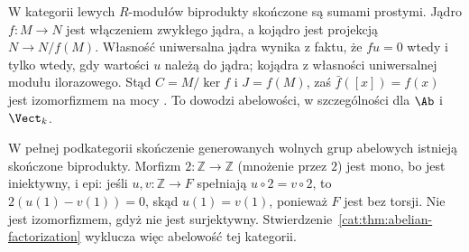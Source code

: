 \begin{przyklad}[Moduły]\label{cat:ex:abelian-modules}
W kategorii lewych $R$-modułów biprodukty skończone są sumami prostymi. Jądro $f:M\to N$ jest włączeniem zwykłego jądra, a kojądro jest projekcją $N\to N/f(M)$. Własność uniwersalna jądra wynika z faktu, że $fu=0$ wtedy i tylko wtedy, gdy wartości $u$ należą do jądra; kojądra z własności uniwersalnej modułu ilorazowego. Stąd $C=M/\ker f$ i $J=f(M)$, zaś $\bar f([x])=f(x)$ jest izomorfizmem na mocy . To dowodzi abelowości, w szczególności dla $\Ab$ i $\Vect_k$.
\end{przyklad}
\begin{przyklad}\label{cat:ex:additive-not-abelian}
W pełnej podkategorii skończenie generowanych wolnych grup abelowych istnieją skończone biprodukty. Morfizm $2:\mathbb Z\to\mathbb Z$ (mnożenie przez $2$) jest mono, bo jest iniektywny, i epi: jeśli $u,v:\mathbb Z\to F$ spełniają $u\circ2=v\circ2$, to $2(u(1)-v(1))=0$, skąd $u(1)=v(1)$, ponieważ $F$ jest bez torsji. Nie jest izomorfizmem, gdyż nie jest surjektywny. Stwierdzenie~\ref{cat:thm:abelian-factorization} wyklucza więc abelowość tej kategorii.
\end{przyklad}

